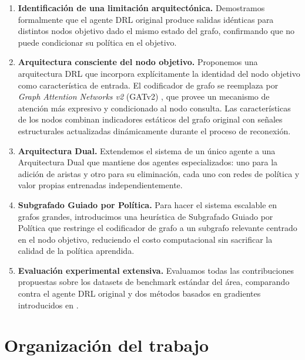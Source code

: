 \documentclass[11pt,a4paper,twoside]{tesis}
\begin{document}
\begin{enumerate}
    \item \textbf{Identificación de una limitación arquitectónica.}
          Demostramos formalmente que el agente DRL original produce salidas idénticas
          para distintos nodos objetivo dado el mismo estado del grafo, confirmando que
          no puede condicionar su política en el objetivo.

    \item \textbf{Arquitectura consciente del nodo objetivo.}
          Proponemos una arquitectura DRL que incorpora explícitamente la identidad del
          nodo objetivo como característica de entrada. El codificador de grafo se
          reemplaza por \emph{Graph Attention Networks v2} (GATv2) \cite{brody2022how},
          que provee un mecanismo de atención más expresivo y condicionado al nodo
          consulta. Las características de los nodos combinan indicadores estáticos del
          grafo original con señales estructurales actualizadas dinámicamente durante el
          proceso de reconexión.

    \item \textbf{Arquitectura Dual.}
          Extendemos el sistema de un único agente a una Arquitectura Dual que mantiene
          dos agentes especializados: uno para la adición de aristas y otro para su
          eliminación, cada uno con redes de política y valor propias entrenadas
          independientemente.

    \item \textbf{Subgrafado Guiado por Política.}
          Para hacer el sistema escalable en grafos grandes, introducimos una heurística
          de Subgrafado Guiado por Política que restringe el codificador de grafo a un
          subgrafo relevante centrado en el nodo objetivo, reduciendo el costo
          computacional sin sacrificar la calidad de la política aprendida.

    \item \textbf{Evaluación experimental extensiva.}
          Evaluamos todas las contribuciones propuestas sobre los datasets de benchmark
          estándar del área, comparando contra el agente DRL original y dos métodos
          basados en gradientes introducidos en \textcite{silvestri2025righthidemaskingcommunity}.
\end{enumerate}

\section*{Organización del trabajo}
\end{document}
